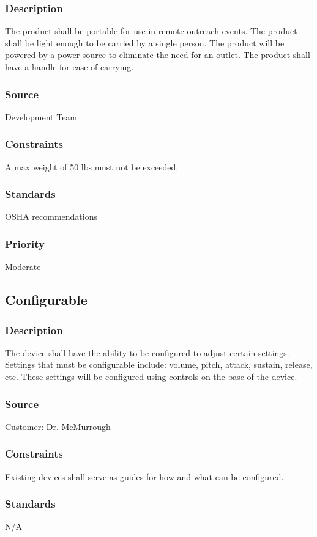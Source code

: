 \subsubsection{Description}
The product shall be portable for use in remote outreach events. The product shall be light enough to be carried by a single person. The product will be powered by a  power source to eliminate the need for an outlet. The product shall have a handle for ease of carrying.
\subsubsection{Source}
Development Team
\subsubsection{Constraints}
A max weight of 50 lbs must not be exceeded.
\subsubsection{Standards}
OSHA recommendations
\subsubsection{Priority}
Moderate

\subsection{Configurable}
\subsubsection{Description}
The device shall have the ability to be configured to adjust certain settings. Settings that must be configurable include: volume, pitch, attack, sustain, release, etc. These settings will be configured using controls on the base of the device.
\subsubsection{Source}
Customer: Dr. McMurrough
\subsubsection{Constraints}
Existing devices shall serve as guides for how and what can be configured.
\subsubsection{Standards}
N/A
